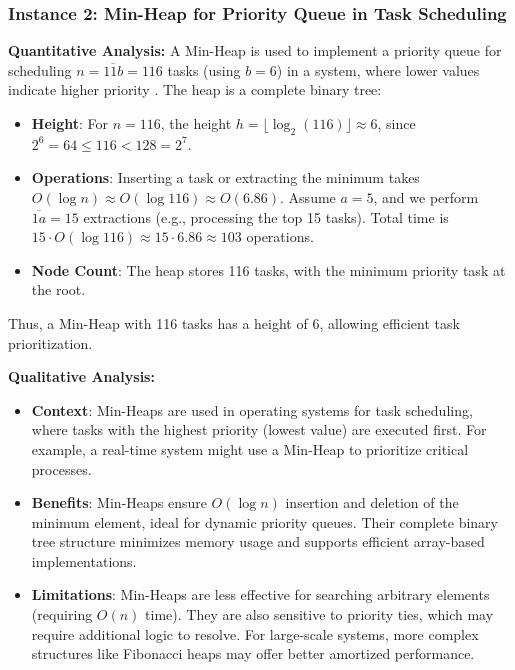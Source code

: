 \documentclass[12pt, a4paper, twoside]{report} %
\begin{document}
\subsubsection*{Instance 2: Min-Heap for Priority Queue in Task Scheduling}

\textbf{Quantitative Analysis:}
A Min-Heap is used to implement a priority queue for scheduling \( n = \overline{11b} = 116 \) tasks (using \( b = 6 \)) in a system, where lower values indicate higher priority \cite{rosen2019}. The heap is a complete binary tree:
\begin{itemize}
  \item \textbf{Height}: For \( n = 116 \), the height \( h = \lfloor \log_2(116) \rfloor \approx 6 \), since \( 2^6 = 64 \leq 116 < 128 = 2^7 \).
  \item \textbf{Operations}: Inserting a task or extracting the minimum takes \( O(\log n) \approx O(\log 116) \approx O(6.86) \). Assume \( a = 5 \), and we perform \( \overline{1a} = 15 \) extractions (e.g., processing the top 15 tasks). Total time is \( 15 \cdot O(\log 116) \approx 15 \cdot 6.86 \approx 103 \) operations.
  \item \textbf{Node Count}: The heap stores 116 tasks, with the minimum priority task at the root.
\end{itemize}
Thus, a Min-Heap with 116 tasks has a height of 6, allowing efficient task prioritization.

\textbf{Qualitative Analysis:}
\begin{itemize}
  \item \textbf{Context}: Min-Heaps are used in operating systems for task scheduling, where tasks with the highest priority (lowest value) are executed first. For example, a real-time system might use a Min-Heap to prioritize critical processes.
  \item \textbf{Benefits}: Min-Heaps ensure \( O(\log n) \) insertion and deletion of the minimum element, ideal for dynamic priority queues. Their complete binary tree structure minimizes memory usage and supports efficient array-based implementations.
  \item \textbf{Limitations}: Min-Heaps are less effective for searching arbitrary elements (requiring \( O(n) \) time). They are also sensitive to priority ties, which may require additional logic to resolve. For large-scale systems, more complex structures like Fibonacci heaps may offer better amortized performance.
\end{itemize}
\end{document}
